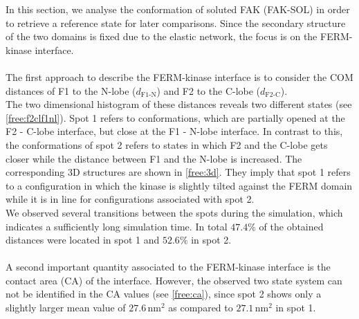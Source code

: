 \label{sec:fak_sol}
In this section, we analyse the conformation of soluted FAK (FAK-SOL) in order to retrieve a reference state for later comparisons. Since the secondary structure of the two domains is fixed due to the elastic network, the focus is on the FERM-kinase interface.\\
\\
The first approach to describe the FERM-kinase interface is to consider the COM distances of F1 to the N-lobe ($d_\text{F1-N}$) and F2 to the C-lobe ($d_\text{F2-C}$).\\
The two dimensional histogram of these distances reveals two different states (see \autoref{free:f2clf1nl}). Spot 1 refers to conformations, which are partially opened at the F2 - C-lobe interface, but close at the F1 - N-lobe interface. In contrast to this, the conformations of spot 2 refers to states in which F2 and the C-lobe gets closer while the distance between F1 and the N-lobe is increased. The corresponding 3D structures are shown in \autoref{free:3d}. They imply that spot 1 refers to a configuration in which the kinase is slightly tilted against the FERM domain while it is in line for configurations associated with spot 2.\\
We observed several transitions between the spots during the simulation, which indicates a sufficiently long simulation time. In total $47.4\%$ of the obtained distances were located in spot 1 and $52.6\%$ in spot 2.\\
\\
A second important quantity associated to the FERM-kinase interface is the contact area (CA) of the interface. However, the observed two state system can not be identified in the CA values (see \autoref{free:ca}), since spot 2 shows only a slightly larger mean value of $27.6\,\si{\nano\metre}^2$ as compared to $27.1\,\si{\nano\metre}^2$ in spot 1.\\
%
%
%
